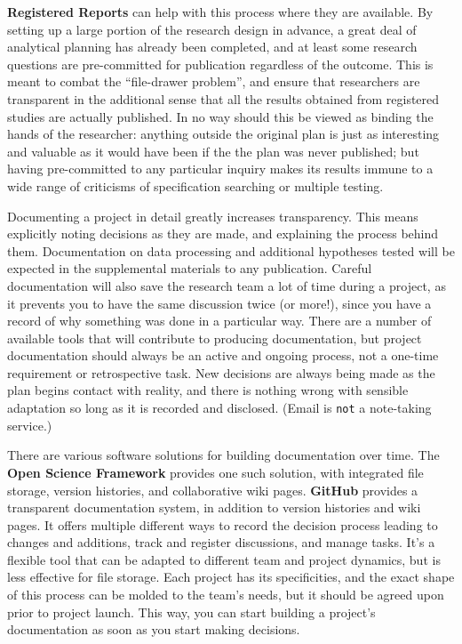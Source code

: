 \textbf{Registered Reports}
can help with this process where they are available.
By setting up a large portion of the research design in advance,
a great deal of analytical planning has already been completed,
and at least some research questions are pre-committed for publication regardless of the outcome.
This is meant to combat the ``file-drawer problem'',\cite{simonsohn2014p}
and ensure that researchers are transparent in the additional sense that
all the results obtained from registered studies are actually published.
In no way should this be viewed as binding the hands of the researcher:
anything outside the original plan is just as interesting and valuable
as it would have been if the the plan was never published;
but having pre-committed to any particular inquiry makes its results
immune to a wide range of criticisms of specification searching or multiple testing.

Documenting a project in detail greatly increases transparency.
This means explicitly noting decisions as they are made, and explaining the process behind them.
Documentation on data processing and additional hypotheses tested will be expected in the supplemental materials to any publication.
Careful documentation will also save the research team a lot of time during a project,
as it prevents you to have the same discussion twice (or more!),
since you have a record of why something was done in a particular way.
There are a number of available tools
that will contribute to producing documentation,
but project documentation should always be an active and ongoing process,
not a one-time requirement or retrospective task.
New decisions are always being made as the plan begins contact with reality,
and there is nothing wrong with sensible adaptation so long as it is recorded and disclosed.
(Email is \texttt{not} a note-taking service.)

There are various software solutions for building documentation over time.
The \textbf{Open Science Framework} provides one such solution,
with integrated file storage, version histories, and collaborative wiki pages.
\textbf{GitHub} provides a transparent documentation system,
in addition to version histories and wiki pages.
It offers multiple different ways to record the decision process leading to changes and additions,
track and register discussions, and manage tasks.
It's a flexible tool that can be adapted to different team and project dynamics,
but is less effective for file storage.
Each project has its specificities,
and the exact shape of this process can be molded to the team's needs,
but it should be agreed upon prior to project launch.
This way, you can start building a project's documentation as soon as you start making decisions.

